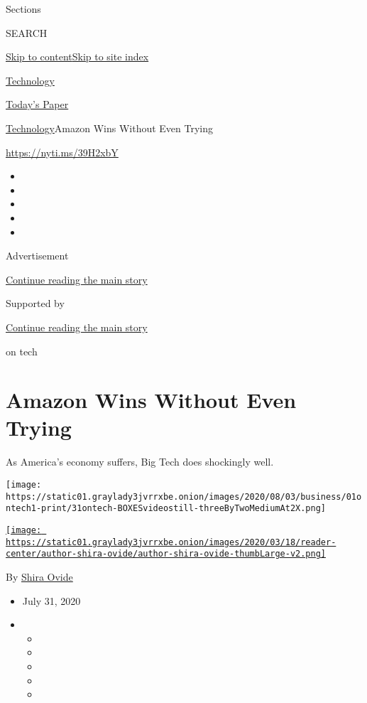 Sections

SEARCH

\protect\hyperlink{site-content}{Skip to
content}\protect\hyperlink{site-index}{Skip to site index}

\href{https://www.nytimes3xbfgragh.onion/section/technology}{Technology}

\href{https://myaccount.nytimes3xbfgragh.onion/auth/login?response_type=cookie\&client_id=vi}{}

\href{https://www.nytimes3xbfgragh.onion/section/todayspaper}{Today's
Paper}

\href{/section/technology}{Technology}\textbar{}Amazon Wins Without Even
Trying

\url{https://nyti.ms/39H2xbY}

\begin{itemize}
\item
\item
\item
\item
\item
\end{itemize}

Advertisement

\protect\hyperlink{after-top}{Continue reading the main story}

Supported by

\protect\hyperlink{after-sponsor}{Continue reading the main story}

on tech

\hypertarget{amazon-wins-without-even-trying}{%
\section{Amazon Wins Without Even
Trying}\label{amazon-wins-without-even-trying}}

As America's economy suffers, Big Tech does shockingly well.

\texttt{[image: https://static01.graylady3jvrrxbe.onion/images/2020/08/03/business/01ontech1-print/31ontech-BOXESvideostill-threeByTwoMediumAt2X.png]}

\href{https://www.nytimes3xbfgragh.onion/by/shira-ovide}{\texttt{[image: https://static01.graylady3jvrrxbe.onion/images/2020/03/18/reader-center/author-shira-ovide/author-shira-ovide-thumbLarge-v2.png]}}

By \href{https://www.nytimes3xbfgragh.onion/by/shira-ovide}{Shira Ovide}

\begin{itemize}
\item
  July 31, 2020
\item
  \begin{itemize}
  \item
  \item
  \item
  \item
  \item
  \end{itemize}
\end{itemize}

